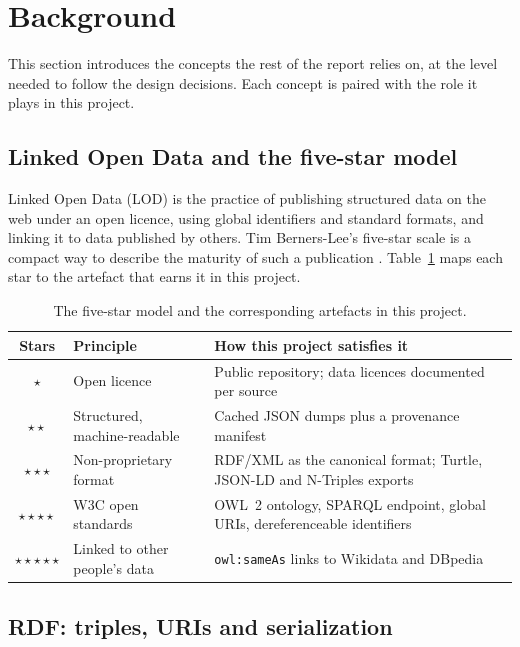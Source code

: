 \section{Background}
\label{sec:background}

This section introduces the concepts the rest of the report relies on, at the
level needed to follow the design decisions. Each concept is paired with the
role it plays in this project.

\subsection{Linked Open Data and the five-star model}

Linked Open Data (LOD) is the practice of publishing structured data on the web
under an open licence, using global identifiers and standard formats, and
linking it to data published by others. Tim Berners-Lee's five-star scale is a
compact way to describe the maturity of such a publication \cite{fivestar}.
Table~\ref{tab:five-star} maps each star to the artefact that earns it in this
project.

\begin{table}[h]
  \centering
  \begin{tabular}{@{}clp{7.4cm}@{}}
    \toprule
    Stars & Principle & How this project satisfies it \\
    \midrule
    $\star$ & Open licence & Public repository; data licences documented per source \\
    $\star\star$ & Structured, machine-readable & Cached JSON dumps plus a provenance manifest \\
    $\star\star\star$ & Non-proprietary format & RDF/XML as the canonical format; Turtle, JSON-LD and N-Triples exports \\
    $\star\star\star\star$ & W3C open standards & OWL~2 ontology, SPARQL endpoint, global URIs, dereferenceable identifiers \\
    $\star\star\star\star\star$ & Linked to other people's data & \texttt{owl:sameAs} links to Wikidata and DBpedia \\
    \bottomrule
  \end{tabular}
  \caption{The five-star model \cite{fivestar} and the corresponding artefacts
  in this project.}
  \label{tab:five-star}
\end{table}

\subsection{RDF: triples, URIs and serialization}

